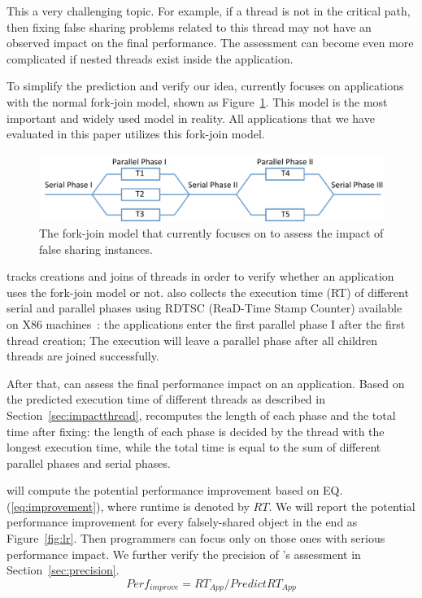 This a very challenging topic. For example, if a thread is not in the critical path, then fixing false sharing problems related to this thread may not have an observed impact on the final performance. The assessment can become even more complicated if nested threads exist inside the application. 

To simplify the prediction and verify our idea, \cheetah{} currently focuses on applications with the normal fork-join model, shown as Figure~\ref{fig:forkjoinmodel}. This model is the most important and widely used model in reality. All applications that we have evaluated in this paper utilizes this fork-join model. 

\begin{figure}[ht!]
\begin{center}
\includegraphics[width=6in]{figure/forkjoin}
\end{center}
\caption{The fork-join model that \Cheetah{} currently focuses on to assess the impact of false sharing instances.   }
\label{fig:forkjoinmodel}
\end{figure}

\cheetah{} tracks creations and joins of threads in order to verify whether an application uses the fork-join model or not. \Cheetah{} also collects the execution time (RT) of different serial and parallel phases using RDTSC (ReaD-Time Stamp Counter) available on X86 machines~\cite{rtdsc}: the applications enter the first parallel phase I after the first thread creation; The execution will leave a parallel phase after all children threads are joined successfully. 

After that, \cheetah{} can assess the final performance impact on an application. Based on the predicted execution time of different threads as described in Section~\ref{sec:impactthread}, \cheetah{} recomputes the length of each phase and the total time after fixing: the length of each phase is decided by the thread with the longest execution time, while the total time is equal to the sum of different parallel phases and serial phases. 

\cheetah{} will compute the potential performance improvement based on EQ.(\ref{eq:improvement}), where runtime is denoted by $RT$. We will report the potential performance improvement for every falsely-shared object in the end as Figure~\ref{fig:lr}. Then programmers can focus only on those ones with serious performance impact. We further verify the precision of \cheetah{}'s assessment in Section~\ref{sec:precision}.
\begin{equation}
\label{eq:improvement}
Perf_{improve}= RT_{App} / PredictRT_{App}
\end{equation}

